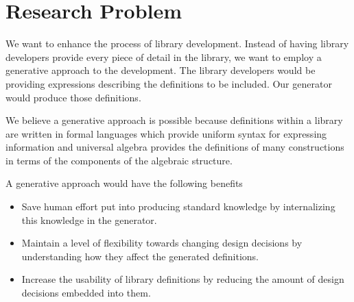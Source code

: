 \section{Research Problem}
\label{sec:questions}


We want to enhance the process of library development. Instead of having library developers provide every piece of detail in the library, we want to employ a generative approach to the development. The library developers would be providing expressions describing the definitions to be included. 
Our generator would produce those definitions. 

We believe a generative approach is possible because definitions within a library are written in formal languages which provide uniform syntax for expressing information and universal algebra provides the definitions of many constructions in terms of the components of the algebraic structure. 

 A generative approach would have the following benefits 
\begin{itemize}
    \item Save human effort put into producing standard knowledge by internalizing this knowledge in the generator.
    \item Maintain a level of flexibility towards changing design decisions by understanding how they affect the generated definitions.
    \item Increase the usability of library definitions by reducing the amount of design decisions embedded into them. 
\end{itemize}  


